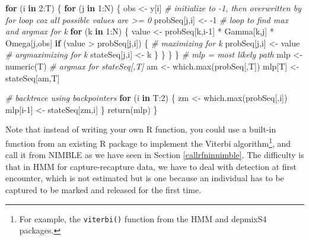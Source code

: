 \documentclass[
  12pt,
]{krantz}
\newenvironment{Shaded}{\begin{snugshade}}{\end{snugshade}}
\newcommand{\CommentTok}[1]{\textcolor[rgb]{0.56,0.35,0.01}{\textit{#1}}}
\newcommand{\ControlFlowTok}[1]{\textcolor[rgb]{0.13,0.29,0.53}{\textbf{#1}}}
\newcommand{\DecValTok}[1]{\textcolor[rgb]{0.00,0.00,0.81}{#1}}
\newcommand{\FunctionTok}[1]{\textcolor[rgb]{0.00,0.00,0.00}{#1}}
\newcommand{\NormalTok}[1]{#1}
\newcommand{\OtherTok}[1]{\textcolor[rgb]{0.56,0.35,0.01}{#1}}
\newcommand{\SpecialCharTok}[1]{\textcolor[rgb]{0.00,0.00,0.00}{#1}}
\begin{document}
\begin{Shaded}
\begin{Highlighting}[]
\ControlFlowTok{for}\NormalTok{ (i }\ControlFlowTok{in} \DecValTok{2}\SpecialCharTok{:}\NormalTok{T) \{}
    \ControlFlowTok{for}\NormalTok{ (j }\ControlFlowTok{in} \DecValTok{1}\SpecialCharTok{:}\NormalTok{N) \{}
\NormalTok{      obs }\OtherTok{\textless{}{-}}\NormalTok{ y[i]}
      \CommentTok{\# initialize to {-}1, then overwritten by for loop coz all possible values are \textgreater{}= 0}
\NormalTok{      probSeq[j,i] }\OtherTok{\textless{}{-}} \SpecialCharTok{{-}}\DecValTok{1}
      \CommentTok{\# loop to find max and argmax for k}
      \ControlFlowTok{for}\NormalTok{ (k }\ControlFlowTok{in} \DecValTok{1}\SpecialCharTok{:}\NormalTok{N) \{}
\NormalTok{        value }\OtherTok{\textless{}{-}}\NormalTok{ probSeq[k,i}\DecValTok{{-}1}\NormalTok{] }\SpecialCharTok{*}\NormalTok{ Gamma[k,j] }\SpecialCharTok{*}\NormalTok{ Omega[j,obs]}
        \ControlFlowTok{if}\NormalTok{ (value }\SpecialCharTok{\textgreater{}}\NormalTok{ probSeq[j,i]) \{}
          \CommentTok{\# maximizing for k}
\NormalTok{          probSeq[j,i] }\OtherTok{\textless{}{-}}\NormalTok{ value}
          \CommentTok{\# argmaximizing for k}
\NormalTok{          stateSeq[j,i] }\OtherTok{\textless{}{-}}\NormalTok{ k}
\NormalTok{        \}}
\NormalTok{      \}}
\NormalTok{    \}}
\NormalTok{  \}}
  \CommentTok{\# mlp = most likely path}
\NormalTok{  mlp }\OtherTok{\textless{}{-}} \FunctionTok{numeric}\NormalTok{(T)}
  \CommentTok{\# argmax for stateSeq[,T]}
\NormalTok{  am }\OtherTok{\textless{}{-}} \FunctionTok{which.max}\NormalTok{(probSeq[,T])}
\NormalTok{  mlp[T] }\OtherTok{\textless{}{-}}\NormalTok{ stateSeq[am,T]}
  
  \CommentTok{\# backtrace using backpointers}
  \ControlFlowTok{for}\NormalTok{ (i }\ControlFlowTok{in}\NormalTok{ T}\SpecialCharTok{:}\DecValTok{2}\NormalTok{) \{}
\NormalTok{    zm }\OtherTok{\textless{}{-}} \FunctionTok{which.max}\NormalTok{(probSeq[,i])}
\NormalTok{    mlp[i}\DecValTok{{-}1}\NormalTok{] }\OtherTok{\textless{}{-}}\NormalTok{ stateSeq[zm,i]}
\NormalTok{  \}}
  \FunctionTok{return}\NormalTok{(mlp)}
\NormalTok{\}}
\end{Highlighting}
\end{Shaded}

Note that instead of writing your own R function, you could use a built-in function from an existing R package to implement the Viterbi algorithm\footnote{For example, the \texttt{viterbi()} function from the HMM and depmixS4 packages.}, and call it from NIMBLE as we have seen in Section \ref{callrfninnimble}. The difficulty is that in HMM for capture-recapture data, we have to deal with detection at first encounter, which is not estimated but is one because an individual has to be captured to be marked and released for the first time.
\end{document}

